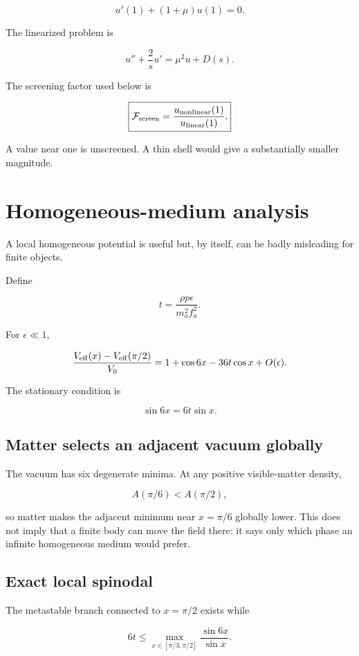 \documentclass[11pt,a4paper]{article}
\begin{document}
\[
u'(1)+(1+\mu)u(1)=0.
\]

The linearized problem is

\[
 u''+\frac2s u'=\mu^2u+D(s).
\]

The screening factor used below is

\[
\boxed{
\mathcal F_{\rm screen}
=
\frac{u_{\rm nonlinear}(1)}{u_{\rm linear}(1)}.
}
\]

A value near one is unscreened. A thin shell would give a substantially
smaller magnitude.



\section{Homogeneous-medium
analysis}\label{homogeneous-medium-analysis}

A local homogeneous potential is useful but, by itself, can be badly
misleading for finite objects.

Define

\[
t
=
\frac{\rho p\epsilon}{m_a^2f_a^2}.
\]

For \(\epsilon\ll1\),

\[
\frac{V_{\rm eff}(x)-V_{\rm eff}(\pi/2)}{V_0}
=
1+\cos6x-36t\cos x+O(\epsilon).
\]

The stationary condition is

\[
\sin6x=6t\sin x.
\]

\subsection{Matter selects an adjacent vacuum
globally}\label{matter-selects-an-adjacent-vacuum-globally}

The vacuum has six degenerate minima. At any positive visible-matter
density,

\[
A(\pi/6)<A(\pi/2),
\]

so matter makes the adjacent minimum near \(x=\pi/6\) globally lower.
This does not imply that a finite body can move the field there: it says
only which phase an infinite homogeneous medium would prefer.

\subsection{Exact local spinodal}\label{exact-local-spinodal}

The metastable branch connected to \(x=\pi/2\) exists while

\[
6t
\le
\max_{x\in[\pi/3,\pi/2]}
\frac{\sin6x}{\sin x}.
\]
\end{document}
